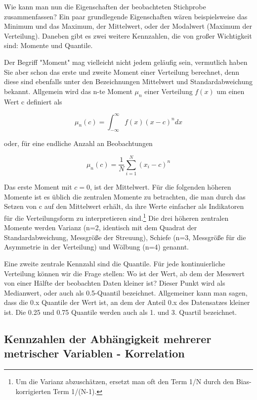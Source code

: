 \documentclass[a4paper,twoside]{tufte-book}\usepackage[]{graphicx}\usepackage[]{color}
\begin{document}
Wie kann man nun die Eigenschaften der beobachteten Stichprobe zusammenfassen? Ein paar grundlegende Eigenschaften wären beispielsweise das Minimum und das Maximum, der Mittelwert, oder der Modalwert (Maximum der Verteilung). Daneben gibt es zwei weitere Kennzahlen, die von großer Wichtigkeit sind: Momente und Quantile.

Der Begriff "Moment" mag vielleicht nicht jedem geläufig sein, vermutlich haben Sie aber schon das erste und zweite Moment einer Verteilung berechnet, denn diese sind ebenfalls unter den Bezeichnungen Mittelwert und Standardabweichung bekannt. Allgemein wird das n-te Moment $\mu_n$ einer Verteilung $f(x)$ um einen Wert c definiert als 

\begin{equation}
\mu_n(c) = \int_{-\infty}^{\infty} f(x) (x - c)^n dx
\end{equation}

oder, für eine endliche Anzahl an Beobachtungen 

\begin{equation}
\mu_n(c) = \frac{1}{N}\sum_{i=1}^N (x_i - c)^n
\end{equation}

Das erste Moment mit $c=0$, ist der Mittelwert. Für die folgenden höheren Momente ist es üblich die zentralen Momente zu betrachten, die man durch das Setzen von c auf den Mittelwert erhält, da ihre Werte einfacher als Indikatoren für die Verteilungsform zu interpretieren sind.\footnote{Um die Varianz abzuschätzen, ersetzt man oft den Term 1/N durch den Bias-korrigierten Term 1/(N-1).} Die drei höheren zentralen Momente werden Varianz (n=2, identisch mit dem Quadrat der Standardabweichung, Messgröße der Streuung), Schiefe (n=3, Messgröße für die Asymmetrie in der Verteilung) und Wölbung (n=4) genannt. 

Eine zweite zentrale Kennzahl sind die Quantile. Für jede kontinuierliche Verteilung können wir die Frage stellen: Wo ist der Wert, ab dem der Messwert von einer Hälfte der beobachten Daten kleiner ist? Dieser Punkt wird als Medianwert, oder auch als 0.5-Quantil bezeichnet. Allgemeiner kann man sagen, dass die 0.x Quantile der Wert ist, an dem der Anteil 0.x des Datensatzes kleiner ist. Die 0.25 und 0.75 Quantile werden auch als 1. und 3. Quartil bezeichnet. 

\subsection{Kennzahlen der Abhängigkeit mehrerer metrischer Variablen - Korrelation}
\end{document}
